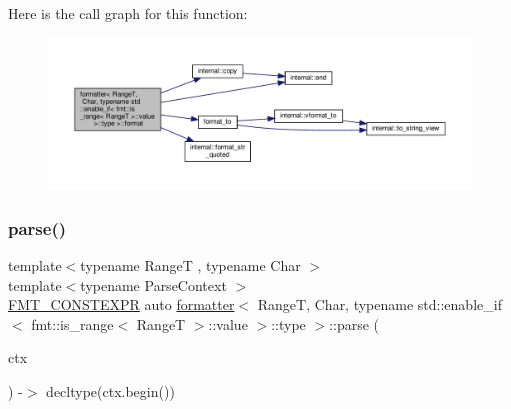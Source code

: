 Here is the call graph for this function\+:
\nopagebreak
\begin{figure}[H]
\begin{center}
\leavevmode
\includegraphics[width=350pt]{structformatter_3_01_range_t_00_01_char_00_01typename_01std_1_1enable__if_3_01fmt_1_1is__range_338ef07b6d6c7537efaa2c888f2ea4c8d_a3fa03f9297c176ec30214531355f9ff3_cgraph}
\end{center}
\end{figure}
\mbox{\label{structformatter_3_01_range_t_00_01_char_00_01typename_01std_1_1enable__if_3_01fmt_1_1is__range_338ef07b6d6c7537efaa2c888f2ea4c8d_a44de9d8176748d483fc5471afe644b73}} 
\subsubsection{\texorpdfstring{parse()}{parse()}}
{\footnotesize\ttfamily template$<$typename RangeT , typename Char $>$ \\
template$<$typename Parse\+Context $>$ \\
\hyperlink{core_8h_a69201cb276383873487bf68b4ef8b4cd}{F\+M\+T\+\_\+\+C\+O\+N\+S\+T\+E\+X\+PR} auto \hyperlink{structformatter}{formatter}$<$ RangeT, Char, typename std\+::enable\+\_\+if$<$ fmt\+::is\+\_\+range$<$ RangeT $>$\+::value $>$\+::type $>$\+::parse (\begin{DoxyParamCaption}\item[{Parse\+Context \&}]{ctx }\end{DoxyParamCaption}) -\/$>$ decltype(ctx.\+begin()) \hspace{0.3cm}{\ttfamily [inline]}}



